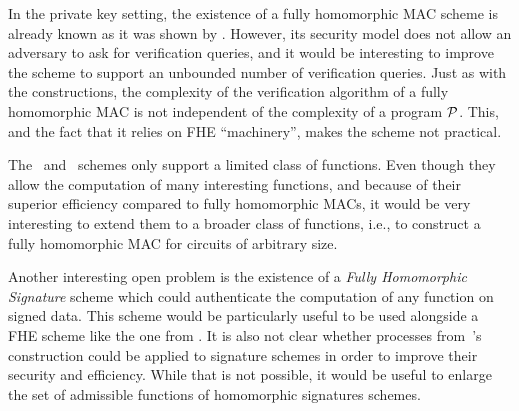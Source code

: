 In the private key setting, the existence of a fully homomorphic MAC scheme is
already known as it was shown by \textcite{gennaro:wichs:2012}. However, its
security model does not allow an adversary to ask for verification queries, and
it would be interesting to improve the  scheme
to support an unbounded number of verification queries. Just as with
the  constructions, the complexity of the
verification algorithm of a fully homomorphic MAC is not independent of the
complexity of a program $\mathcal{P}$. This, and the fact that it relies on FHE
``machinery'', makes the  scheme not practical.

The~
and~ schemes only support a limited
class of functions. Even though they allow the computation of many interesting
functions, and because of their superior efficiency compared to fully
homomorphic MACs, it would be very interesting to extend them to a broader
class of functions, i.e., to construct a fully homomorphic MAC for circuits of
arbitrary size. 

Another interesting open problem is the existence of a \emph{Fully Homomorphic
Signature} scheme which could authenticate the computation of any function on
signed data. This scheme would be particularly useful to be used alongside
a FHE scheme like the one from \textcite{gentry:2009:FHE}. It is also not clear
whether processes from~\citeauthor{gentry:2009:FHE}'s construction could be
applied to signature schemes in order to improve their security and efficiency.
While that is not possible, it would be useful to enlarge the set of admissible
functions of homomorphic signatures schemes.

